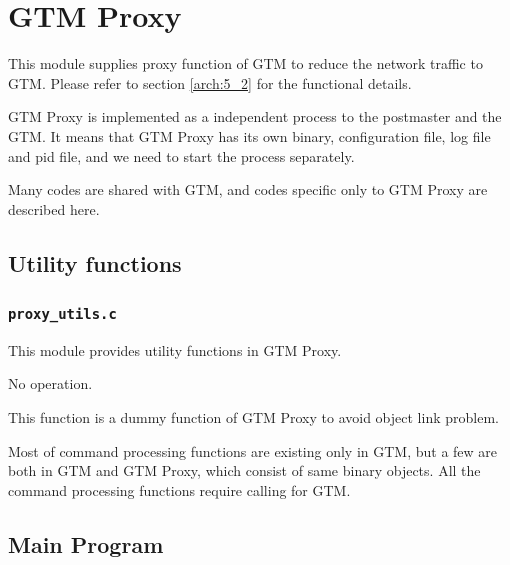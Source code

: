 \section{\label{sec:gtmProxy}GTM Proxy}


  This module supplies proxy function of GTM to reduce the network traffic to GTM.
  Please refer to section \ref{arch:5_2} for the functional details.
  
  GTM Proxy is implemented as a independent process to the postmaster and the GTM.
  It means that GTM Proxy has its own binary, configuration file, log file and pid file, and we need to start the process separately.
  
  Many codes are shared with GTM, and codes specific only to GTM Proxy are described here.
  


\subsection{Utility functions}
  


\subsubsection{\texttt{proxy\_utils.c}}
  
  This module provides utility functions in GTM Proxy.
  
  
    No operation.
    
    This function is a dummy function of GTM Proxy to avoid object link problem.
    
    Most of command processing functions are existing only in GTM, but a few are both in
	GTM and GTM Proxy, which consist of same binary objects.
    All the command processing functions require calling
     for GTM.




\subsection{Main Program}


